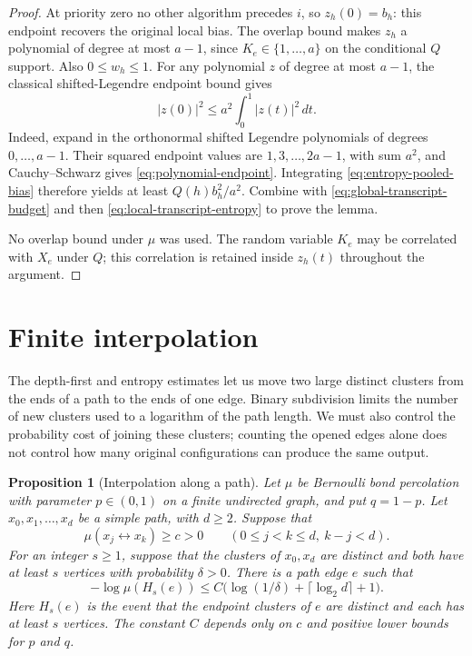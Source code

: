 \documentclass[11pt]{article}
\newtheorem{proposition}[theorem]{Proposition}
\theoremstyle{definition}
\begin{document}
\begin{proof}
At priority zero no other algorithm precedes $i$, so $z_h(0)=b_h$:
this endpoint recovers the original local bias. The overlap bound makes
$z_h$ a polynomial of degree at most $a-1$, since
$K_e\in\{1,\ldots,a\}$ on the conditional $Q$ support. Also
$0\le w_h\le1$. For any polynomial $z$ of degree
at most $a-1$, the classical shifted-Legendre endpoint bound
\cite[Tables~18.3.1 and~18.6.1]{DLMF} gives
\begin{equation}\label{eq:polynomial-endpoint}
 |z(0)|^2\le a^2\int_0^1|z(t)|^2\,dt.
\end{equation}
Indeed, expand in the orthonormal shifted Legendre polynomials of
degrees $0,\ldots,a-1$. Their squared endpoint values are
$1,3,\ldots,2a-1$, with sum $a^2$, and Cauchy--Schwarz gives
\eqref{eq:polynomial-endpoint}.
Integrating \eqref{eq:entropy-pooled-bias} therefore yields at least
$Q(h)b_h^2/a^2$. Combine with
\eqref{eq:global-transcript-budget} and then
\eqref{eq:local-transcript-entropy} to prove the lemma.

No overlap bound under $\mu$ was used. The random variable $K_e$ may
be correlated with $X_e$ under $Q$; this correlation is retained inside
$z_h(t)$ throughout the argument.
\end{proof}

\section{Finite interpolation}\label{sec:interpolation}

The depth-first and entropy estimates let us move two large distinct
clusters from the ends of a path to the ends of one edge. Binary
subdivision limits the number of new clusters used to a logarithm of
the path length. We must also control the probability cost of joining
these clusters; counting the opened edges alone does not control how
many original configurations can produce the same output.

\begin{proposition}[Interpolation along a path]\label{prop:interpolation}
Let $\mu$ be Bernoulli bond percolation with parameter $p\in(0,1)$ on
a finite undirected graph, and put $q=1-p$. Let
$x_0,x_1,\ldots,x_d$ be a simple path, with $d\ge2$. Suppose that
\[
 \mu(x_j\leftrightarrow x_k)\ge c>0
 \qquad(0\le j<k\le d,\ k-j<d).
\]
For an integer $s\ge1$, suppose that the clusters of $x_0,x_d$ are
distinct and both have at least $s$ vertices with probability
$\delta>0$. There is a path edge $e$ such that
\[
 -\log\mu(H_s(e))
 \le C\bigl(\log(1/\delta)+\lceil\log_2d\rceil+1\bigr).
\]
Here $H_s(e)$ is the event that the endpoint clusters of $e$ are
distinct and each has at least $s$ vertices. The constant $C$ depends
only on $c$ and positive lower bounds for $p$ and $q$.
\end{proposition}
\end{document}
